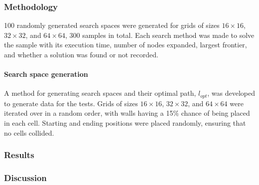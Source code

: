 \subsubsection{Methodology} %
\label{sub:methodology}

100 randomly generated search spaces were generated for grids of sizes $16 \times 16$, $32 \times 32$, and $64 \times 64$, 300 samples in total. Each search method was made to solve the sample with its execution time, number of nodes expanded, largest frontier, and whether a solution was found or not recorded.

\paragraph{Search space generation} %
\label{par:search_space_generation}
A method for generating search spaces and their optimal path, $l_{opt}$, was developed to generate data for the tests. Grids of sizes $16 \times 16$, $32 \times 32$, and $64 \times 64$ were iterated over in a random order, with walls having a 15\% chance of being placed in each cell. Starting and ending positions were placed randomly, ensuring that no cells collided.


\subsubsection{Results} %
\label{sub:results}


\subsubsection{Discussion} %
\label{sub:discussion}



